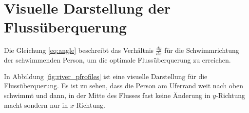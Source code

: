 %
%
%
%
\section{Visuelle Darstellung der Flussüberquerung
\label{schwimmen:section:bildliche_darstellung}}
%



Die Gleichung \eqref{eq:angle} beschreibt das Verhältnis \(\frac{dy}{dx}\) für die Schwimmrichtung der schwimmenden Person, um die optimale Flussüberquerung zu erreichen. 

In Abbildung \ref{fig:river_pfrofiles} ist eine visuelle Darstellung für die Flussüberquerung. Es ist zu sehen, dass die Person am Uferrand weit nach oben schwimmt und dann, in der Mitte des Flusses fast keine Änderung in \(y\)-Richtung macht sondern nur in \(x\)-Richtung.




